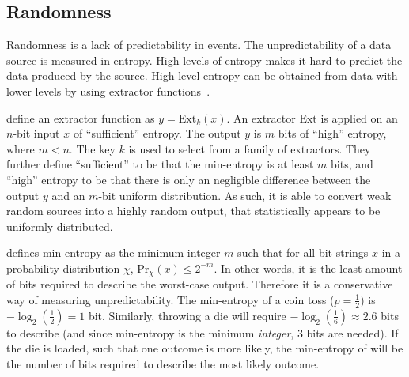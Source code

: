 \subsection{Randomness}

Randomness is a lack of predictability in events. The unpredictability of a data source is measured in entropy. High levels of entropy makes it hard to predict the data produced by the source. High level entropy can be obtained from data with lower levels by using extractor functions~\cite{pseudorandomness}.

\citet{bonneau2015bitcoin} define an extractor function as $y = \text{Ext}_k(x)$. An extractor $\text{Ext}$ is applied on an $n$-bit input $x$ of \enquote{sufficient} entropy.
The output $y$ is $m$ bits of \enquote{high} entropy, where $m < n$. The key $k$ is used to select from a family of extractors.
They further define \enquote{sufficient} to be that the min-entropy is at least $m$ bits, and \enquote{high} entropy to be that there is only an negligible difference between the output $y$ and an $m$-bit uniform distribution.
As such, it is able to convert weak random sources into a highly random output, that statistically appears to be uniformly distributed.


\citet{dodis2004randomness} defines min-entropy as the minimum integer $m$ such that for all bit strings $x$ in a probability distribution $\chi$, $\text{Pr}_\chi(x) \leq 2^{-m}$.
In other words, it is the least amount of bits required to describe the worst-case output. Therefore it is a conservative way of measuring unpredictability.
The min-entropy of a coin toss ($p = \frac{1}{2}$) is $-\log_2(\frac{1}{2}) = 1$ bit. Similarly, throwing a die will require $-\log_2(\frac{1}{6}) \approx 2.6$ bits to describe (and since min-entropy is the minimum \emph{integer}, 3 bits are needed).
If the die is loaded, such that one outcome is more likely, the min-entropy of will be the number of bits required to describe the most likely outcome.

